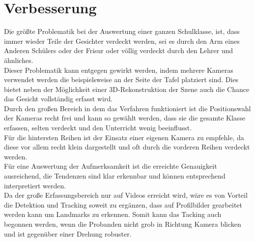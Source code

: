 \section{Verbesserung}
Die größte Problematik bei der Auswertung einer ganzen Schulklasse, ist, dass immer wieder Teile der Gesichter verdeckt werden, sei es durch den Arm eines Anderen Schülers oder der Frisur oder völlig verdeckt durch den Lehrer und ähnliches.\\
Dieser Problematik kann entgegen gewirkt werden, indem mehrere Kameras verwendet werden die beispielsweise an der Seite der Tafel platziert sind. Dies bietet neben der Möglichkeit einer 3D-Rekonstruktion der Szene auch die Chance das Gesicht vollständig erfasst wird.\\
Durch den großen Bereich in dem das Verfahren funktioniert ist die Positionswahl der Kameras recht frei und kann so gewählt werden, dass sie die gesamte Klasse erfassen, selten verdeckt und den Unterricht wenig beeinflusst.\\
Für die hintersten Reihen ist der Einsatz einer eigenen Kamera zu empfehle, da diese vor allem recht klein dargestellt und oft durch die vorderen Reihen verdeckt werden.\\
Für eine Auswertung der Aufmerksamkeit ist die erreichte Genauigkeit ausreichend, die Tendenzen sind klar erkennbar und können entsprechend interpretiert werden.\\
Da der große Erfassungsbereich nur auf Videos erreicht wird, wäre es von Vorteil die Detektion und Tracking soweit zu ergänzen, dass auf Profilbilder gearbeitet werden kann um Landmarks zu erkennen. Somit kann das Tacking auch begonnen werden, wenn die Probanden nicht grob in Richtung Kamera blicken und ist gegenüber einer Drehung robuster.